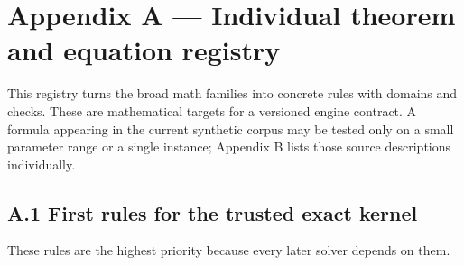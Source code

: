 \documentclass[
  10pt,
]{article}
\begin{document}
\section{Appendix A --- Individual theorem and equation
registry}\label{appendix-a-individual-theorem-and-equation-registry}

This registry turns the broad math families into concrete rules with
domains and checks. These are mathematical targets for a versioned
engine contract. A formula appearing in the current synthetic corpus may
be tested only on a small parameter range or a single instance; Appendix
B lists those source descriptions individually.

\subsection{A.1 First rules for the trusted exact
kernel}\label{a.1-first-rules-for-the-trusted-exact-kernel}

These rules are the highest priority because every later solver depends
on them.
\end{document}
